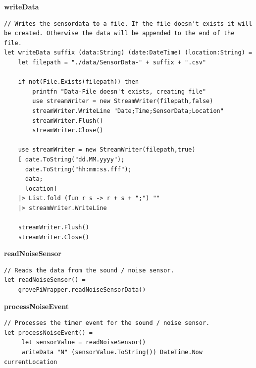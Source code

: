 \textbf{writeData}
\begin{lstlisting}
// Writes the sensordata to a file. If the file doesn't exists it will be created. Otherwise the data will be appended to the end of the file.
let writeData suffix (data:String) (date:DateTime) (location:String) = 
    let filepath = "./data/SensorData-" + suffix + ".csv"

    if not(File.Exists(filepath)) then
        printfn "Data-File doesn't exists, creating file"
        use streamWriter = new StreamWriter(filepath,false)
        streamWriter.WriteLine "Date;Time;SensorData;Location"
        streamWriter.Flush()
        streamWriter.Close()

    use streamWriter = new StreamWriter(filepath,true)
    [ date.ToString("dd.MM.yyyy");
      date.ToString("hh:mm:ss.fff");
      data;
      location]
    |> List.fold (fun r s -> r + s + ";") ""
    |> streamWriter.WriteLine

    streamWriter.Flush()
    streamWriter.Close()
\end{lstlisting} 

\textbf{readNoiseSensor}
\begin{lstlisting}
// Reads the data from the sound / noise sensor. 
let readNoiseSensor() = 
	grovePiWrapper.readNoiseSensorData()
\end{lstlisting}  
   
   
\textbf{processNoiseEvent}
\begin{lstlisting}
// Processes the timer event for the sound / noise sensor.
let processNoiseEvent() =
     let sensorValue = readNoiseSensor()
     writeData "N" (sensorValue.ToString()) DateTime.Now currentLocation
\end{lstlisting}
